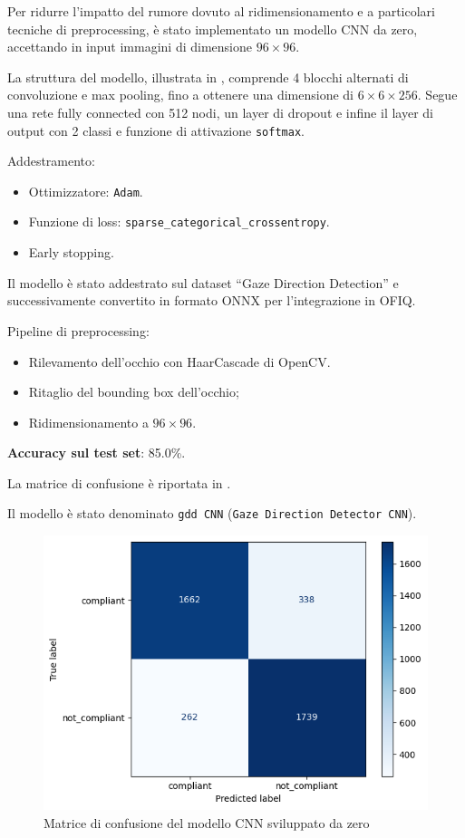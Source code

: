 \documentclass[12pt,a4paper,openright,twoside]{book}
\begin{document}
Per ridurre l'impatto del rumore dovuto al ridimensionamento e a particolari tecniche di preprocessing, è stato implementato un modello CNN da zero, accettando in input immagini di dimensione \(96 \times 96\).  

La struttura del modello, illustrata in , comprende 4 blocchi alternati di convoluzione e max pooling, fino a ottenere una dimensione di \(6 \times 6 \times 256\). Segue una rete fully connected con 512 nodi, un layer di dropout e infine il layer di output con 2 classi e funzione di attivazione \texttt{softmax}.  

Addestramento:
\begin{itemize}
    \item Ottimizzatore: \texttt{Adam}.
    \item Funzione di loss: \texttt{sparse\_categorical\_crossentropy}.
    \item Early stopping.
\end{itemize}

Il modello è stato addestrato sul dataset ``Gaze Direction Detection'' e successivamente convertito in formato ONNX per l'integrazione in OFIQ.  

Pipeline di preprocessing:
\begin{itemize}
    \item Rilevamento dell'occhio con HaarCascade di OpenCV.
    \item Ritaglio del bounding box dell'occhio;
    \item Ridimensionamento a \(96 \times 96\).
\end{itemize}

\textbf{Accuracy sul test set}: 85.0\%.  

La matrice di confusione è riportata in .  

Il modello è stato denominato \texttt{gdd CNN} (\texttt{Gaze Direction Detector CNN}).

\begin{figure}
    \centering
    \includegraphics[width=.6\linewidth]{figures/custom-cnn-confusion-matrix.png}
    \caption{Matrice di confusione del modello CNN sviluppato da zero}
    \label{fig:custom_cnn_confusion_matrix}
\end{figure}
\end{document}
